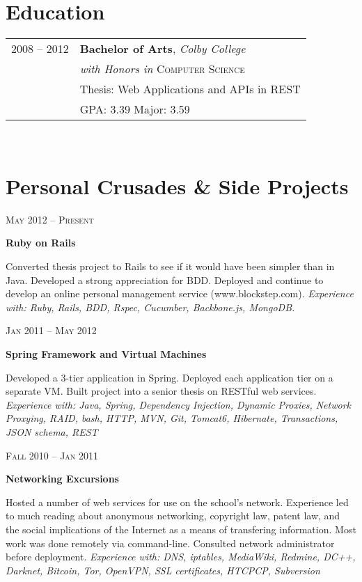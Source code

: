 \documentclass[10pt]{article} %
\begin{document}
{\begin{minipage}[t]{0.44\textwidth}

\section{Education}

\begin{tabular}{rl} %

2008 -- \textsc{2012} & \textbf{Bachelor of Arts}, \textit{Colby College}\\ 
											& \textit{with Honors in} \textsc{Computer Science} \\
											& \footnotesize Thesis: Web Applications and APIs in REST \\
											& \small{GPA: 3.39} \small{Major: 3.59} \\
\end{tabular}\\

\section{Personal Crusades \& Side Projects}


{\raggedleft\textsc{May 2012 -- Present}\par}
{\raggedright\large \textbf{Ruby on Rails}}
{\normalsize{ Converted thesis project to Rails to see if it would have been simpler than in Java. Developed a strong appreciation for BDD. Deployed and continue to develop an online personal management service (www.blockstep.com).}
\textit{Experience with: Ruby, Rails, BDD, Rspec, Cucumber, Backbone.js, MongoDB. }}


{\raggedleft\textsc{Jan 2011 -- May 2012}\par}
{\raggedright\large \textbf{Spring Framework and Virtual Machines} }
{\normalsize{ Developed a 3-tier application in Spring. Deployed each application tier on a separate VM. Built project into a senior thesis on RESTful web services. }
\textit{Experience with: Java, Spring, Dependency Injection, Dynamic Proxies, Network Proxying, RAID, bash, HTTP, MVN, Git, Tomcat6, Hibernate, Transactions, JSON schema, REST } }

{\raggedleft\textsc{Fall 2010 -- Jan 2011}\par}
{\raggedright\large \textbf{Networking Excursions} }
{\normalsize{Hosted a number of web services for use on the school's network. Experience led to much reading about anonymous networking, copyright law, patent law, and the social implications of the Internet as a means of transfering information. Most work was done remotely via command-line. Consulted network administrator before deployment. }
\textit{Experience with: DNS, iptables, MediaWiki, Redmine, DC++, Darknet, Bitcoin, Tor, OpenVPN, SSL certificates, HTCPCP, Subversion}}\\



\end{minipage}}
\end{document}
